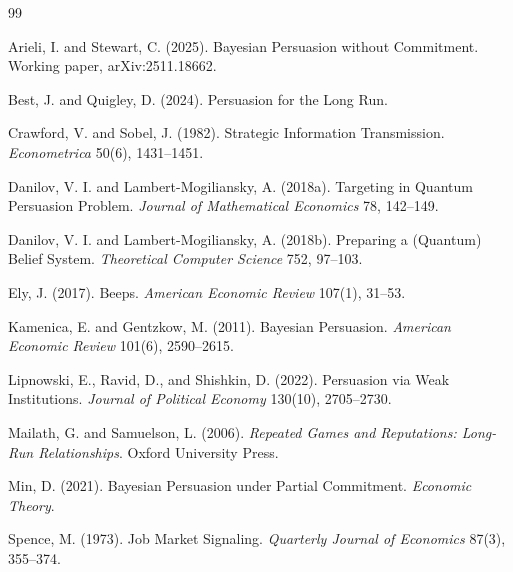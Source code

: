 \documentclass[12pt]{article}
\begin{document}
\newpage
\begin{thebibliography}{99}

 Arieli, I. and Stewart, C. (2025). Bayesian Persuasion without Commitment. Working paper, arXiv:2511.18662.

 Best, J. and Quigley, D. (2024). Persuasion for the Long Run.

 Crawford, V. and Sobel, J. (1982). Strategic Information Transmission. \textit{Econometrica} 50(6), 1431--1451.

 Danilov, V. I. and Lambert-Mogiliansky, A. (2018a). Targeting in Quantum Persuasion Problem. \textit{Journal of Mathematical Economics} 78, 142--149.

 Danilov, V. I. and Lambert-Mogiliansky, A. (2018b). Preparing a (Quantum) Belief System. \textit{Theoretical Computer Science} 752, 97--103.

 Ely, J. (2017). Beeps. \textit{American Economic Review} 107(1), 31--53.

 Kamenica, E. and Gentzkow, M. (2011). Bayesian Persuasion. \textit{American Economic Review} 101(6), 2590--2615.

 Lipnowski, E., Ravid, D., and Shishkin, D. (2022). Persuasion via Weak Institutions. \textit{Journal of Political Economy} 130(10), 2705--2730.

 Mailath, G. and Samuelson, L. (2006). \textit{Repeated Games and Reputations: Long-Run Relationships}. Oxford University Press.

 Min, D. (2021). Bayesian Persuasion under Partial Commitment. \textit{Economic Theory}.

 Spence, M. (1973). Job Market Signaling. \textit{Quarterly Journal of Economics} 87(3), 355--374.

\end{thebibliography}
\end{document}
